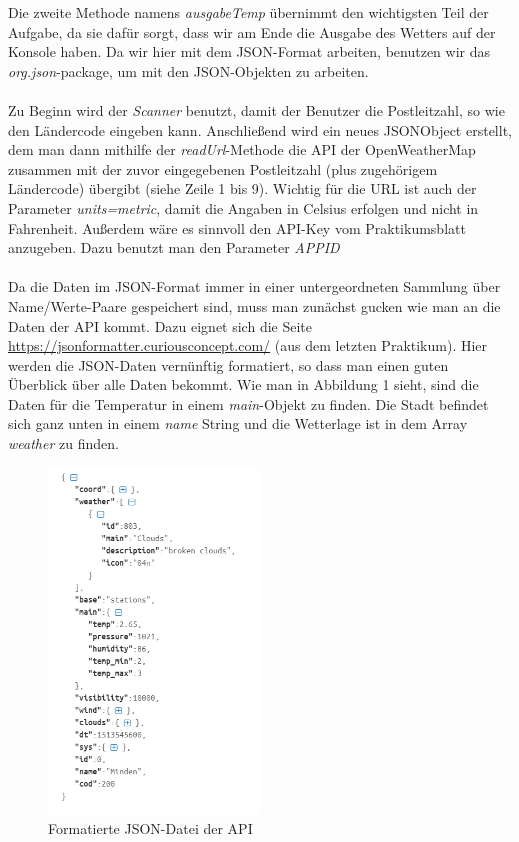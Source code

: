 Die zweite Methode namens \textit{ausgabeTemp} übernimmt den wichtigsten Teil der Aufgabe, da sie dafür sorgt, dass wir am Ende die Ausgabe des Wetters auf der Konsole haben. Da wir hier mit dem JSON-Format arbeiten, benutzen wir das \textit{org.json}-package, um mit den JSON-Objekten zu arbeiten. \\
\\
Zu Beginn wird der \textit{Scanner} benutzt, damit der Benutzer die Postleitzahl, so wie den Ländercode eingeben kann. Anschließend wird ein neues JSONObject erstellt, dem man dann mithilfe der \textit{readUrl}-Methode die API der OpenWeatherMap zusammen mit der zuvor eingegebenen Postleitzahl (plus zugehörigem Ländercode) übergibt (siehe Zeile 1 bis 9). Wichtig für die URL ist auch der Parameter \textit{units=metric}, damit die Angaben in Celsius erfolgen und nicht in Fahrenheit. Außerdem wäre es sinnvoll den API-Key vom Praktikumsblatt anzugeben. Dazu benutzt man den Parameter \textit{APPID}\\
\\
Da die Daten im JSON-Format immer in einer untergeordneten Sammlung über Name/Werte-Paare gespeichert sind, muss man zunächst gucken wie man an die Daten der API kommt. Dazu eignet sich die Seite \url{https://jsonformatter.curiousconcept.com/} (aus dem letzten Praktikum). Hier werden die JSON-Daten vernünftig formatiert, so dass man einen guten Überblick über alle Daten bekommt. Wie man in Abbildung 1 sieht, sind die Daten für die Temperatur in einem \textit{main}-Objekt zu finden. Die Stadt befindet sich ganz unten in einem \textit{name} String und die Wetterlage ist in dem Array \textit{weather} zu finden.

\begin{figure}[htbp]
\begin{center}
\includegraphics[width=0.5\textwidth]{Bild1}
\caption{Formatierte JSON-Datei der API}
\end{center}
\end{figure}

